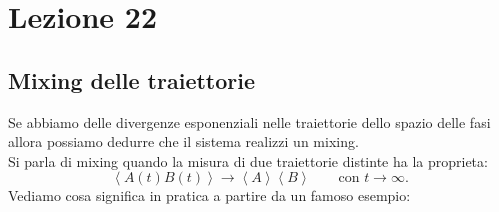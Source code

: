 \section{Lezione 22}%
\label{sub:Lezione 22}
\subsection{Mixing delle traiettorie}%
\label{sub:Mixing delle traiettorie}
Se abbiamo delle divergenze esponenziali nelle traiettorie dello spazio delle fasi allora possiamo dedurre che il sistema realizzi un mixing.\\
Si parla di mixing quando la misura di due traiettorie distinte ha la proprieta:
\[
    \left<A(t)B(t)\right> \to  \left<A\right>\left<B\right> \qquad \text{con } t\to \infty
.\] 
Vediamo cosa significa in pratica a partire da un famoso esempio:
